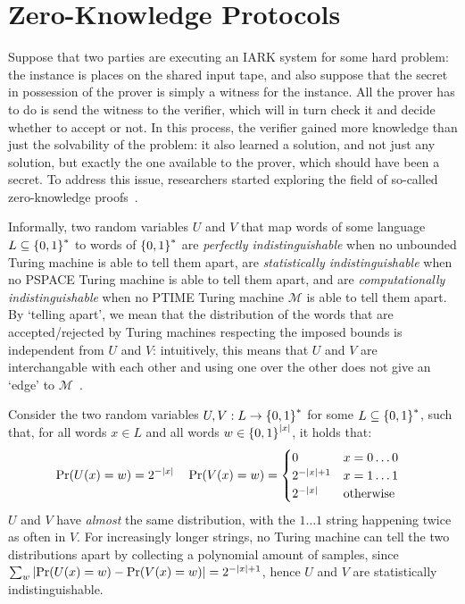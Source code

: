 \section{Zero-Knowledge Protocols}\label{sec:zero_knowledge}
Suppose that two parties are executing an IARK system for some hard problem: the instance is places 
on the shared input tape, and also suppose that the secret in possession of the prover is simply 
a witness for the instance. 
All the prover has to do is send the witness to the verifier, which will in turn check it and 
decide whether to accept or not.
In this process, the verifier gained more knowledge than just the solvability of the problem: it 
also learned a solution, and not just any solution, but exactly the one available to the prover,
which should have been a secret.
To address this issue, researchers started exploring the field of so-called zero-knowledge 
proofs~\cite{GoldwasserMR1989,GoldreichMW1991}.

Informally, two random variables \(U\) and \(V\) that map words of some language 
\(L \subseteq \left\{0, 1\right\}^{*}\) to words of \(\left\{0, 1\right\}^{*}\) are 
\emph{perfectly indistinguishable} when no unbounded Turing machine is able to tell them apart,
are \emph{statistically indistinguishable} when no \textsc{PSPACE} Turing machine is able to 
tell them apart, and are \emph{computationally indistinguishable} when no \textsc{PTIME} Turing 
machine \(\mathcal{M}\) is able to tell them apart.
By `telling apart', we mean that the distribution of the words that are accepted/rejected 
by Turing machines respecting the imposed bounds is independent from \(U\) and \(V\): intuitively,
this means that \(U\) and \(V\) are interchangable with each other and using one over the other 
does not give an `edge' to \(\mathcal{M}\)~\cite{GoldwasserM1984,GoldwasserMR1989,Yao1982}.
\begin{example}
  Consider the two random variables \(U, V: L \to \left\{0, 1\right\}^{*}\) for some 
  \(L \subseteq \left\{0, 1\right\}^{*}\), such that, for all words \(x \in L\) and all words 
  \(w \in \left\{0, 1\right\}^{\left\lvert x\right\rvert}\), it holds that:
  \begin{align*}
    & \call{\Pr}{\call{U}{x} = w} = 2^{-\abs{x}} &&
    \call{\Pr}{\call{V}{x} = w} = \begin{cases}
      0 & x = 0\dots0 \\
      2^{-\abs{x} + 1} & x = 1\dots1 \\
      2^{-\abs{x}} & \textrm{otherwise}
    \end{cases}
  \end{align*}
  \(U\) and \(V\) have \emph{almost} the same distribution, with the \(1\dots1\) string 
  happening twice as often in \(V\). 
  For increasingly longer strings, no Turing machine can tell the two distributions apart by 
  collecting a polynomial amount of samples, since 
  \(\sum_{w}{\abs{\call{\Pr}{\call{U}{x} = w} - \call{\Pr}{\call{V}{x} = w}}} = 2^{-\abs{x}+1}\),
  hence \(U\) and \(V\) are statistically indistinguishable.
\end{example}

